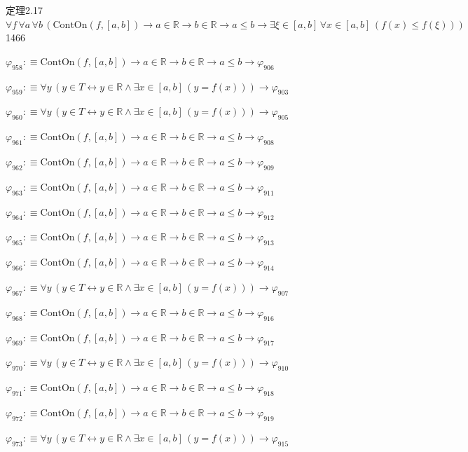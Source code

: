 \begin{fullproof}{定理2.17}{$\forall f\,\forall a\,\forall b\,(\mathrm{ContOn}(f,[a,b]) \to a \in \mathbb{R} \to b \in \mathbb{R} \to a \leq b \to \exists \xi \in [a,b]\,\forall x \in [a,b]\,(f(x) \leq f(\xi)))$}{1466}
\begin{abbrevlist}
\item $\varphi_{958} :\equiv \mathrm{ContOn}(f,[a,b]) \to a \in \mathbb{R} \to b \in \mathbb{R} \to a \leq b \to \varphi_{906}$
\item $\varphi_{959} :\equiv \forall y\,(y \in T \leftrightarrow y \in \mathbb{R} \land \exists x \in [a,b]\,(y = f(x))) \to \varphi_{903}$
\item $\varphi_{960} :\equiv \forall y\,(y \in T \leftrightarrow y \in \mathbb{R} \land \exists x \in [a,b]\,(y = f(x))) \to \varphi_{905}$
\item $\varphi_{961} :\equiv \mathrm{ContOn}(f,[a,b]) \to a \in \mathbb{R} \to b \in \mathbb{R} \to a \leq b \to \varphi_{908}$
\item $\varphi_{962} :\equiv \mathrm{ContOn}(f,[a,b]) \to a \in \mathbb{R} \to b \in \mathbb{R} \to a \leq b \to \varphi_{909}$
\item $\varphi_{963} :\equiv \mathrm{ContOn}(f,[a,b]) \to a \in \mathbb{R} \to b \in \mathbb{R} \to a \leq b \to \varphi_{911}$
\item $\varphi_{964} :\equiv \mathrm{ContOn}(f,[a,b]) \to a \in \mathbb{R} \to b \in \mathbb{R} \to a \leq b \to \varphi_{912}$
\item $\varphi_{965} :\equiv \mathrm{ContOn}(f,[a,b]) \to a \in \mathbb{R} \to b \in \mathbb{R} \to a \leq b \to \varphi_{913}$
\item $\varphi_{966} :\equiv \mathrm{ContOn}(f,[a,b]) \to a \in \mathbb{R} \to b \in \mathbb{R} \to a \leq b \to \varphi_{914}$
\item $\varphi_{967} :\equiv \forall y\,(y \in T \leftrightarrow y \in \mathbb{R} \land \exists x \in [a,b]\,(y = f(x))) \to \varphi_{907}$
\item $\varphi_{968} :\equiv \mathrm{ContOn}(f,[a,b]) \to a \in \mathbb{R} \to b \in \mathbb{R} \to a \leq b \to \varphi_{916}$
\item $\varphi_{969} :\equiv \mathrm{ContOn}(f,[a,b]) \to a \in \mathbb{R} \to b \in \mathbb{R} \to a \leq b \to \varphi_{917}$
\item $\varphi_{970} :\equiv \forall y\,(y \in T \leftrightarrow y \in \mathbb{R} \land \exists x \in [a,b]\,(y = f(x))) \to \varphi_{910}$
\item $\varphi_{971} :\equiv \mathrm{ContOn}(f,[a,b]) \to a \in \mathbb{R} \to b \in \mathbb{R} \to a \leq b \to \varphi_{918}$
\item $\varphi_{972} :\equiv \mathrm{ContOn}(f,[a,b]) \to a \in \mathbb{R} \to b \in \mathbb{R} \to a \leq b \to \varphi_{919}$
\item $\varphi_{973} :\equiv \forall y\,(y \in T \leftrightarrow y \in \mathbb{R} \land \exists x \in [a,b]\,(y = f(x))) \to \varphi_{915}$

\end{abbrevlist}
\end{fullproof}
